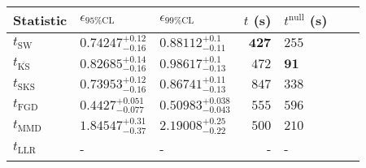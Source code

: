 \begin{tabular}{l|llr|llr}
	Statistic & $\epsilon_{95\%\mathrm{CL}}$ & $\epsilon_{99\%\mathrm{CL}}$ & $t$ (s) & $t^{\mathrm{null}}$ (s) \\
	\midrule
	$t_{\mathrm{SW}}$ & $0.74247_{-0.16}^{+0.12}$ & $0.88112_{-0.11}^{+0.1}$ & ${\mathbf{427}}$ & $255$ \\
	$t_{\overline{\mathrm{KS}}}$ & $0.82685_{-0.16}^{+0.14}$ & $0.98617_{-0.13}^{+0.1}$ & $472$ & ${\mathbf{91}}$ \\
	$t_{\mathrm{SKS}}$ & $0.73953_{-0.16}^{+0.12}$ & $0.86741_{-0.13}^{+0.11}$ & $847$ & $338$ \\
	$t_{\mathrm{FGD}}$ & ${\mathbf{0.4427_{-0.077}^{+0.051}}}$ & ${\mathbf{0.50983_{-0.043}^{+0.038}}}$ & $555$ & $596$ \\
	$t_{\mathrm{MMD}}$ & $1.84547_{-0.37}^{+0.31}$ & $2.19008_{-0.22}^{+0.25}$ & $500$ & $210$ \\
	$t_{\mathrm{LLR}}$ & - & - & - & - \\
	\bottomrule
\end{tabular}